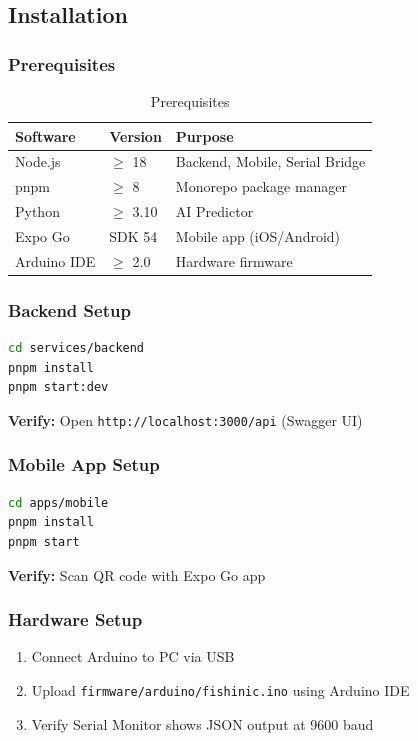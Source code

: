 \documentclass[12pt,a4paper,oneside]{article}
\begin{document}
\subsection{Installation}

\subsubsection{Prerequisites}
\begin{table}[H]
    \centering
    \begin{tabularx}{\textwidth}{lll}
        \toprule
        \textbf{Software} & \textbf{Version} & \textbf{Purpose} \\
        \midrule
        Node.js & $\ge$ 18 & Backend, Mobile, Serial Bridge \\
        pnpm & $\ge$ 8 & Monorepo package manager \\
        Python & $\ge$ 3.10 & AI Predictor \\
        Expo Go & SDK 54 & Mobile app (iOS/Android) \\
        Arduino IDE & $\ge$ 2.0 & Hardware firmware \\
        \bottomrule
    \end{tabularx}
    \caption{Prerequisites}
\end{table}

\subsubsection{Backend Setup}
\begin{lstlisting}[language=bash]
cd services/backend
pnpm install
pnpm start:dev
\end{lstlisting}
\textbf{Verify:} Open \texttt{http://localhost:3000/api} (Swagger UI)

\subsubsection{Mobile App Setup}
\begin{lstlisting}[language=bash]
cd apps/mobile
pnpm install
pnpm start
\end{lstlisting}
\textbf{Verify:} Scan QR code with Expo Go app

\subsubsection{Hardware Setup}
\begin{enumerate}
    \item Connect Arduino to PC via USB
    \item Upload \texttt{firmware/arduino/fishinic.ino} using Arduino IDE
    \item Verify Serial Monitor shows JSON output at 9600 baud
\end{enumerate}
\end{document}

